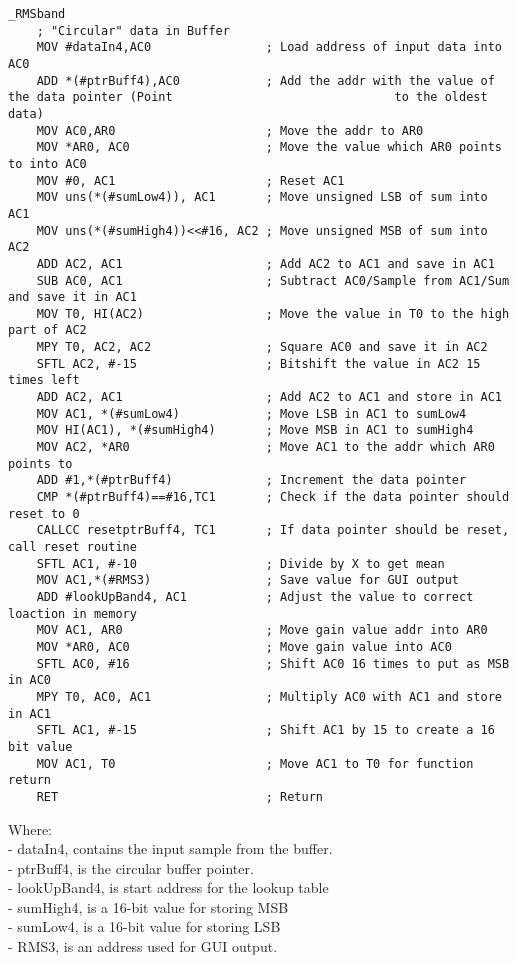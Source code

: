 \begin{lstlisting}[language={[x86masm]Assembler}, caption = {limiter Algorithm},label={listingCompressorMain}]
_RMSband
	; "Circular" data in Buffer
	MOV #dataIn4,AC0				; Load address of input data into AC0
	ADD *(#ptrBuff4),AC0			; Add the addr with the value of the data pointer (Point 					 	       to the oldest data)
	MOV AC0,AR0						; Move the addr to AR0
	MOV *AR0, AC0					; Move the value which AR0 points to into AC0
	MOV #0, AC1						; Reset AC1
	MOV uns(*(#sumLow4)), AC1       ; Move unsigned LSB of sum into AC1
	MOV uns(*(#sumHigh4))<<#16, AC2 ; Move unsigned MSB of sum into AC2
	ADD AC2, AC1					; Add AC2 to AC1 and save in AC1
	SUB AC0, AC1					; Subtract AC0/Sample from AC1/Sum and save it in AC1	 
	MOV T0, HI(AC2)					; Move the value in T0 to the high part of AC2
	MPY T0, AC2, AC2				; Square AC0 and save it in AC2
	SFTL AC2, #-15					; Bitshift the value in AC2 15 times left 
	ADD AC2, AC1					; Add AC2 to AC1 and store in AC1
	MOV AC1, *(#sumLow4)			; Move LSB in AC1 to sumLow4
	MOV HI(AC1), *(#sumHigh4)		; Move MSB in AC1 to sumHigh4
	MOV AC2, *AR0					; Move AC1 to the addr which AR0 points to
	ADD #1,*(#ptrBuff4)				; Increment the data pointer
	CMP *(#ptrBuff4)==#16,TC1		; Check if the data pointer should reset to 0
	CALLCC resetptrBuff4, TC1		; If data pointer should be reset, call reset routine
	SFTL AC1, #-10					; Divide by X to get mean
	MOV AC1,*(#RMS3)				; Save value for GUI output
	ADD #lookUpBand4, AC1			; Adjust the value to correct loaction in memory
	MOV AC1, AR0					; Move gain value addr into AR0
	MOV *AR0, AC0					; Move gain value into AC0
	SFTL AC0, #16					; Shift AC0 16 times to put as MSB in AC0
	MPY T0, AC0, AC1				; Multiply AC0 with AC1 and store in AC1 
	SFTL AC1, #-15					; Shift AC1 by 15 to create a 16 bit value
	MOV AC1, T0						; Move AC1 to T0 for function return
	RET								; Return
\end{lstlisting}

Where: \\
- dataIn4, contains the input sample from the buffer. \\
- ptrBuff4, is the circular buffer pointer. \\
- lookUpBand4, is start address for the lookup table\\
- sumHigh4, is a 16-bit value for storing MSB \\
- sumLow4, is a 16-bit value for storing LSB \\
- RMS3, is an address used for GUI output. \\


